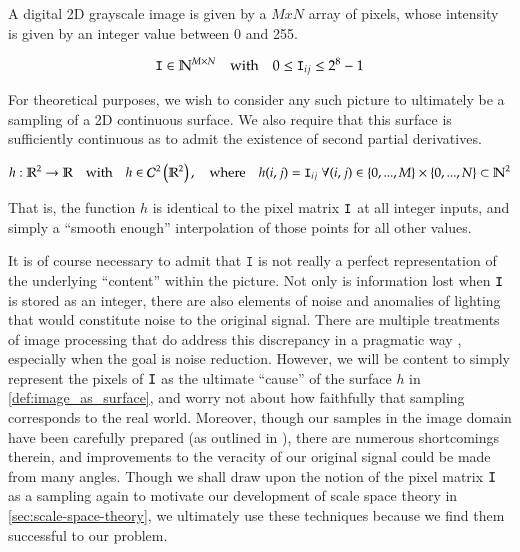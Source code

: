 
A digital 2D grayscale image is given by a $MxN$ array of pixels, whose intensity is given by an integer value between 0 and 255.

\begin{defn} \label{def:image_as_pixel_matrix}
	\begin{equation*}
	\mathtt{I} \in \mathbb{N}^{M \times N}
	\quad\textrm{with}\quad
	0 \le \mathtt{I}_{ij} \le 2^8 - 1
	\end{equation*}
\end{defn}
	For theoretical purposes, we wish to consider any such picture to ultimately be a sampling of a 2D continuous surface. We also require that this surface is sufficiently continuous as to admit the existence of second partial derivatives.
	
\begin{defn} \label{def:image_as_surface}
 \begin{equation*}
 h: \mathbb{R}^2 \to \mathbb{R}
 \quad \textrm{with}\quad
 h \in \mathcal{C}^2\left(\mathbb{R}^2\right),
 \quad\textrm{where}\quad
    h(i,j) = \mathtt{I}_{ij}
    \; \forall (i,j) \in
     \left\{0,...,M\right\} \times
     \left\{0,...,N\right\} \subset \mathbb{N}^2
    \end{equation*}
\end{defn}
That is, the function $h$ is identical to the pixel matrix $\mathtt{I}$ at all integer inputs,
and simply a ``smooth enough'' interpolation of those points for all other values.


It is of course necessary to admit that $\mathtt{I}$ is not really a perfect representation of the underlying ``content'' within the picture. Not only is information lost when $\mathtt{I}$ is stored as an integer, there are also elements of noise and anomalies of lighting that would constitute noise to the original signal. There are multiple treatments of image processing that do address this discrepancy in a pragmatic way \cite{DIPGW}, especially when the goal is noise reduction.
However, we will be content to simply represent the pixels of $\mathtt{I}$ as the ultimate ``cause'' of the surface $h$ in \cref{def:image_as_surface}, and worry not about how faithfully that sampling corresponds to the real world.
Moreover, though our samples in the image domain have been carefully prepared (as outlined in \label{sec:NCS-data-set}), there are numerous shortcomings therein, and improvements to the veracity of our original signal could be made from many angles.
Though we shall draw upon the notion of the pixel matrix $\mathtt{I}$ as a sampling again to motivate our development of scale space theory in \cref{sec:scale-space-theory}, we ultimately use these techniques because we find them successful to our problem.
 
